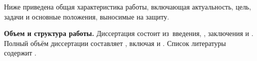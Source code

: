 Ниже приведена общая характеристика работы, включающая актуальность, цель, задачи
и основные положения, выносимые на защиту.

\newcommand{\actuality}{}
\newcommand{\progress}{}
\newcommand{\aim}{{\textbf\aimTXT}}
\newcommand{\tasks}{\textbf{\tasksTXT}}
\newcommand{\novelty}{\textbf{\noveltyTXT}}
\newcommand{\influence}{\textbf{\influenceTXT}}
\newcommand{\methods}{\textbf{\methodsTXT}}
\newcommand{\defpositions}{\textbf{\defpositionsTXT}}
\newcommand{\reliability}{\textbf{\reliabilityTXT}}
\newcommand{\probation}{\textbf{\probationTXT}}
\newcommand{\contribution}{\textbf{\contributionTXT}}
\newcommand{\publications}{\textbf{\publicationsTXT}}


\textbf{Объем и структура работы.} Диссертация состоит из~введения,
,
заключения и
.
%
Полный объём диссертации составляет
, включая
 и
.
Список литературы содержит
.
